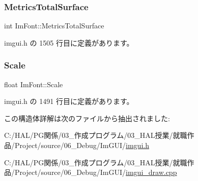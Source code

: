 \subsubsection{\texorpdfstring{Metrics\+Total\+Surface}{MetricsTotalSurface}}
{\footnotesize\ttfamily int Im\+Font\+::\+Metrics\+Total\+Surface}



 imgui.\+h の 1505 行目に定義があります。

\mbox{\label{struct_im_font_ae98fb07fd8862a7243d77b11f38bba19}} 
\subsubsection{\texorpdfstring{Scale}{Scale}}
{\footnotesize\ttfamily float Im\+Font\+::\+Scale}



 imgui.\+h の 1491 行目に定義があります。



この構造体詳解は次のファイルから抽出されました\+:\begin{DoxyCompactItemize}
\item 
C\+:/\+H\+A\+L/\+P\+G関係/03\+\_\+作成プログラム/03\+\_\+\+H\+A\+L授業/就職作品/\+Project/source/06\+\_\+\+Debug/\+Im\+G\+U\+I/\mbox{\hyperlink{imgui_8h}{imgui.\+h}}\item 
C\+:/\+H\+A\+L/\+P\+G関係/03\+\_\+作成プログラム/03\+\_\+\+H\+A\+L授業/就職作品/\+Project/source/06\+\_\+\+Debug/\+Im\+G\+U\+I/\mbox{\hyperlink{imgui__draw_8cpp}{imgui\+\_\+draw.\+cpp}}\end{DoxyCompactItemize}

